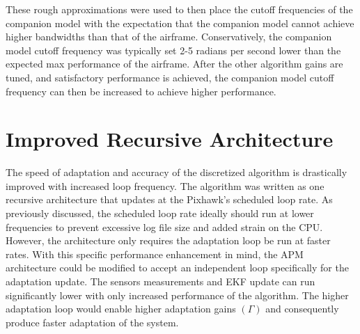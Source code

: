 These rough approximations were used to then place the cutoff frequencies of the companion model with the expectation that the companion model cannot achieve higher bandwidths than that of the airframe.  Conservatively, the companion model cutoff frequency was typically set 2-5 radians per second lower than the expected max performance of the airframe.  After the other algorithm gains are tuned, and satisfactory performance is achieved, the companion model cutoff frequency can then be increased to achieve higher performance.

\section{Improved Recursive Architecture}

The speed of adaptation and accuracy of the discretized \Lone algorithm is drastically improved with increased loop frequency.  The algorithm was written as one recursive architecture that updates at the Pixhawk's scheduled loop rate.  As previously discussed, the scheduled loop rate ideally should run at lower frequencies to prevent excessive log file size and added strain on the CPU.  However, the \Lone architecture only requires the adaptation loop be run at faster rates.  With this specific performance enhancement in mind, the \ac{APM} architecture could be modified to accept an independent loop specifically for the \Lone adaptation update.  The sensors measurements and \ac{EKF} update can run significantly lower with only increased performance of the algorithm.  The higher adaptation loop would enable higher adaptation gains $(\Gamma)$ and consequently produce faster adaptation of the system.


